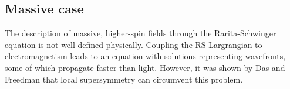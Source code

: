 \subsection{Massive case}
The description of massive, higher-spin fields through the Rarita-Schwinger
equation is not well defined physically. Coupling the RS Largrangian to
electromagnetism leads to an equation with solutions representing wavefronts,
some of which propagate faster than light. However, it was shown by Das and
Freedman that local supersymmetry can circumvent this problem.



